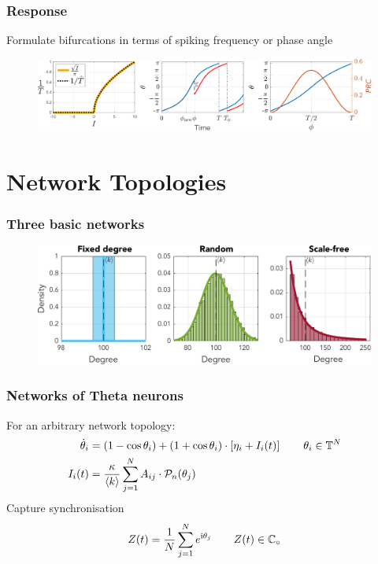 \begin{frame}
\frametitle{Response}
\tabitem Formulate bifurcations in terms of spiking frequency or phase angle
\begin{figure}[H]
\centering
\includegraphics[width = \textwidth]{../Figures/ThetaNeuronfIandPRC.pdf}
\label{fig:ThetaNeuronfIandPRC}
\end{figure}
\end{frame}



\section{Network Topologies}
\begin{frame}
\frametitle{Three basic networks}
\begin{figure}[H]
\centering
\includegraphics[width = \textwidth]{../Figures/Distributions/1D.pdf}
\label{fig:1Dpdfs}
\end{figure}
\end{frame}

\begin{frame}
\frametitle{Networks of Theta neurons}
\tabitem For an arbitrary network topology:
\begin{align*}
\dot{\theta}_{i} &=\left(1-\cos \theta_{i}\right)+\left(1+\cos \theta_{i}\right) \cdot \left[\eta_{i} + I_{i}(t)\right] \qquad \theta_i \in {\mathbb{T}}^N \\
I_{i}(t) &=\frac{\kappa}{{\langle k\rangle}} \sum_{j=1}^{N} A_{i j} \cdot \mathcal{P}_{n}(\theta_{j}) 
\end{align*}
\tabitem Capture synchronisation
\begin{align*}
Z(t) = \frac{1}{N} \sum_{j=1}^N e^{{\rm{i}}\theta_j}  \qquad Z(t) \in \mathbb{C}_\circ 
\end{align*}
\end{frame}



